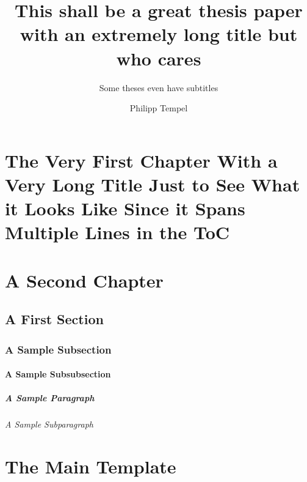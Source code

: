 \documentclass[%
    thesis=ma, %
    language=american, %
    paper=a4,%
    listings,
    online,
    final,
]{isw}
\title{This shall be a great thesis paper with an extremely long title but who cares}
\subtitle{Some theses even have subtitles}
\author{Philipp Tempel}
\begin{document}
    \maketitle
    
    \begin{otherlanguage}{ngerman}
        \maketitle
    \end{otherlanguage}
    
    \tableofcontents
    
    \listoffigures
    
    \listoftables
    
    \listoftodos
    
    \chapter[The Short Title of the Chapter Showing Up in the TOC and the Page Headers]{The Very First Chapter With a Very Long Title Just to See What it Looks Like Since it Spans Multiple Lines in the ToC}
    
    \chapter{A Second Chapter}
    
    \section{A First Section}
    
    \subsection{A Sample Subsection}
    
    \subsubsection{A Sample Subsubsection}
    
    \paragraph{A Sample Paragraph}
    
    \subparagraph{A Sample Subparagraph}
    
    \chapter{The Main Template}
    
\end{document}

